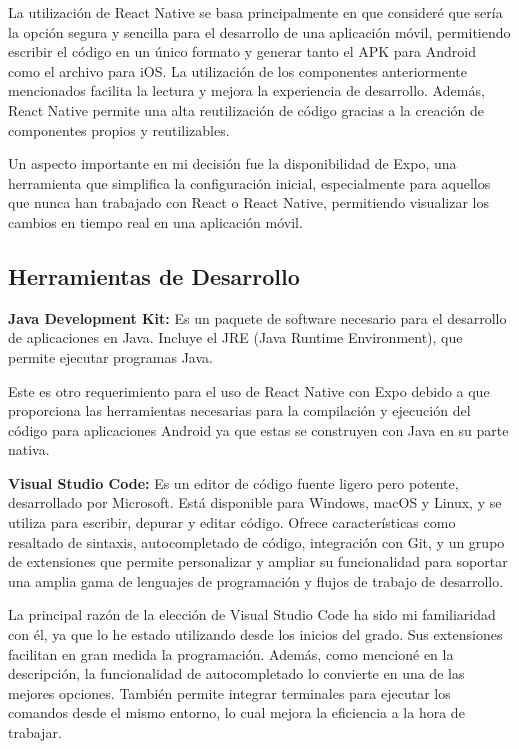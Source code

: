 La utilización de React Native se basa principalmente en que consideré que sería la opción segura y sencilla para el desarrollo de una aplicación móvil, permitiendo escribir el código en un único formato y generar tanto el APK para Android como el archivo para iOS. La utilización de los componentes anteriormente mencionados facilita la lectura y mejora la experiencia de desarrollo. Además, React Native permite una alta reutilización de código gracias a la creación de componentes propios y reutilizables. 

Un aspecto importante en mi decisión fue la disponibilidad de Expo, una herramienta que simplifica la configuración inicial, especialmente para aquellos que nunca han trabajado con React o React Native, permitiendo visualizar los cambios en tiempo real en una aplicación móvil.

\subsection{Herramientas de Desarrollo}

\textbf{Java Development Kit:} Es un paquete de software necesario para el desarrollo de aplicaciones en Java. Incluye el JRE (Java Runtime Environment), que permite ejecutar programas Java. \cite{geeksforgeeks}

Este es otro requerimiento para el uso de React Native con Expo debido a que proporciona las herramientas necesarias para la compilación y ejecución del código para aplicaciones Android ya que estas se construyen con Java en su parte nativa.

\textbf{Visual Studio Code:} Es un editor de código fuente ligero pero potente, desarrollado por Microsoft. Está disponible para Windows, macOS y Linux, y se utiliza para escribir, depurar y editar código. Ofrece características como resaltado de sintaxis, autocompletado de código, integración con Git, y un grupo de extensiones que permite personalizar y ampliar su funcionalidad para soportar una amplia gama de lenguajes de programación y flujos de trabajo de desarrollo. \cite{vscode}

La principal razón de la elección de Visual Studio Code ha sido mi familiaridad con él, ya que lo he estado utilizando desde los inicios del grado. Sus extensiones facilitan en gran medida la programación. Además, como mencioné en la descripción, la funcionalidad de autocompletado lo convierte en una de las mejores opciones. También permite integrar terminales para ejecutar los comandos desde el mismo entorno, lo cual mejora la eficiencia a la hora de trabajar.

